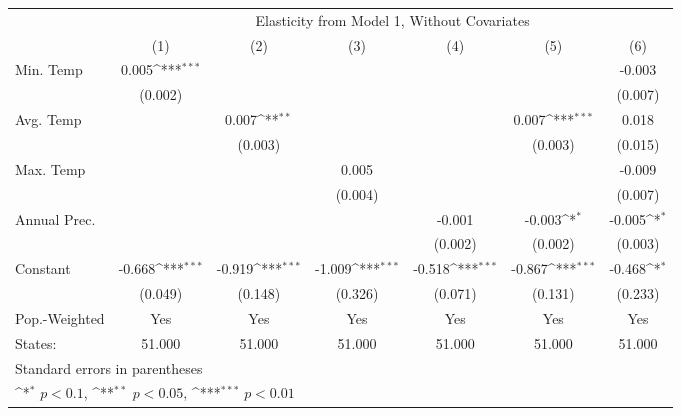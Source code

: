 {
\def\sym#1{\ifmmode^{#1}\else\(^{#1}\)\fi}
\begin{tabular}{l*{6}{c}}
\hline\hline
            &\multicolumn{6}{c}{Elasticity from Model 1, Without Covariates}                                                                    \\
            &\multicolumn{1}{c}{(1)}         &\multicolumn{1}{c}{(2)}         &\multicolumn{1}{c}{(3)}         &\multicolumn{1}{c}{(4)}         &\multicolumn{1}{c}{(5)}         &\multicolumn{1}{c}{(6)}         \\
\hline
Min. Temp   &       0.005\sym{***}&                     &                     &                     &                     &      -0.003         \\
            &     (0.002)         &                     &                     &                     &                     &     (0.007)         \\
[1em]
Avg. Temp   &                     &       0.007\sym{**} &                     &                     &       0.007\sym{***}&       0.018         \\
            &                     &     (0.003)         &                     &                     &     (0.003)         &     (0.015)         \\
[1em]
Max. Temp   &                     &                     &       0.005         &                     &                     &      -0.009         \\
            &                     &                     &     (0.004)         &                     &                     &     (0.007)         \\
[1em]
Annual Prec.&                     &                     &                     &      -0.001         &      -0.003\sym{*}  &      -0.005\sym{*}  \\
            &                     &                     &                     &     (0.002)         &     (0.002)         &     (0.003)         \\
[1em]
Constant    &      -0.668\sym{***}&      -0.919\sym{***}&      -1.009\sym{***}&      -0.518\sym{***}&      -0.867\sym{***}&      -0.468\sym{*}  \\
            &     (0.049)         &     (0.148)         &     (0.326)         &     (0.071)         &     (0.131)         &     (0.233)         \\
\hline
Pop.-Weighted&         Yes         &         Yes         &         Yes         &         Yes         &         Yes         &         Yes         \\
States:     &      51.000         &      51.000         &      51.000         &      51.000         &      51.000         &      51.000         \\
\hline\hline
\multicolumn{7}{l}{\footnotesize Standard errors in parentheses}\\
\multicolumn{7}{l}{\footnotesize \sym{*} \(p<0.1\), \sym{**} \(p<0.05\), \sym{***} \(p<0.01\)}\\
\end{tabular}
}
